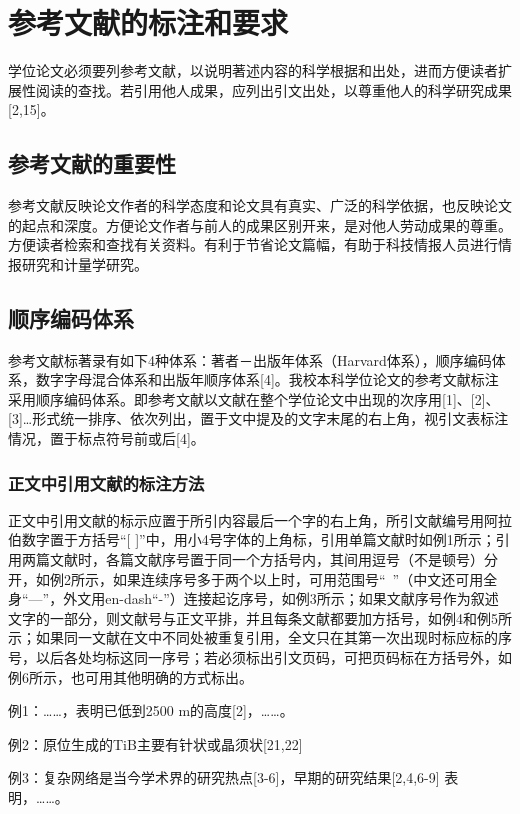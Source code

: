 \chapter{参考文献的标注和要求}

学位论文必须要列参考文献，以说明著述内容的科学根据和出处，进而方便读者扩展性阅读的查找。若引用他人成果，应列出引文出处，以尊重他人的科学研究成果[2,15]。

\section{参考文献的重要性}

参考文献反映论文作者的科学态度和论文具有真实、广泛的科学依据，也反映论文的起点和深度。方便论文作者与前人的成果区别开来，是对他人劳动成果的尊重。方便读者检索和查找有关资料。有利于节省论文篇幅，有助于科技情报人员进行情报研究和计量学研究。

\section{顺序编码体系}

参考文献标著录有如下4种体系：著者－出版年体系（Harvard体系），顺序编码体系，数字字母混合体系和出版年顺序体系[4]。我校本科学位论文的参考文献标注采用顺序编码体系。即参考文献以文献在整个学位论文中出现的次序用[1]、[2]、[3]…形式统一排序、依次列出，置于文中提及的文字末尾的右上角，视引文表标注情况，置于标点符号前或后[4]。

\subsection{正文中引用文献的标注方法}

正文中引用文献的标示应置于所引内容最后一个字的右上角，所引文献编号用阿拉伯数字置于方括号“[ ]”中，用小4号字体的上角标，引用单篇文献时如例1所示；引用两篇文献时，各篇文献序号置于同一个方括号内，其间用逗号（不是顿号）分开，如例2所示，如果连续序号多于两个以上时，可用范围号“~”（中文还可用全身“—”，外文用en-dash“-”）连接起讫序号，如例3所示；如果文献序号作为叙述文字的一部分，则文献号与正文平排，并且每条文献都要加方括号，如例4和例5所示；如果同一文献在文中不同处被重复引用，全文只在其第一次出现时标应标的序号，以后各处均标这同一序号；若必须标出引文页码，可把页码标在方括号外，如例6所示，也可用其他明确的方式标出。

例1：……，表明已低到2500 m的高度[2]，……。

例2：原位生成的TiB主要有针状或晶须状[21,22]

例3：复杂网络是当今学术界的研究热点[3-6]，早期的研究结果[2,4,6-9] 表明，……。

